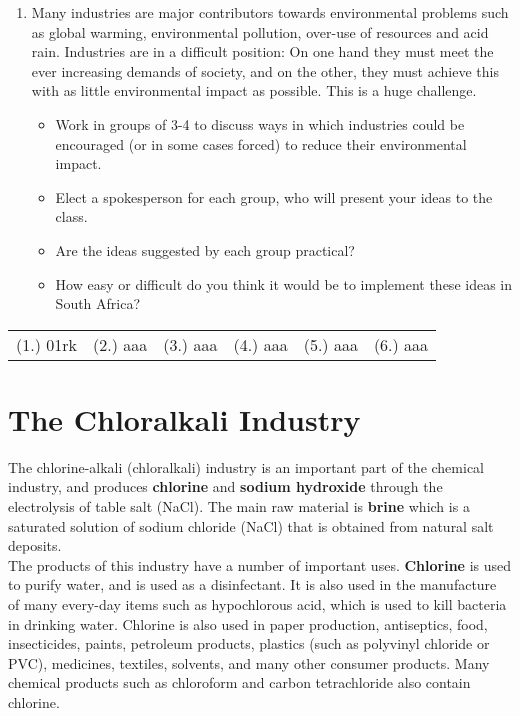 {\begin{enumerate}
\item{Many industries are major contributors towards environmental problems such as global warming, environmental pollution, over-use of resources and acid rain. Industries are in a difficult position: On one hand they must meet the ever increasing demands of society, and on the other, they must achieve this with as little environmental impact as possible. This is a huge challenge.

\begin{itemize}
\item{Work in groups of 3-4 to discuss ways in which industries could be encouraged (or in some cases forced) to reduce their environmental impact.}
\item{Elect a spokesperson for each group, who will present your ideas to the class.}
\item{Are the ideas suggested by each group practical?}
\item{How easy or difficult do you think it would be to implement these ideas in South Africa?}
\end{itemize}}
\end{enumerate}

\par \practiceinfo
\par \begin{tabular}[h]{cccccc}
(1.)	01rk	&
(2.)	aaa	&
(3.)	aaa	&
(4.)	aaa	&
(5.)	aaa	&
(6.)	aaa	\\
\end{tabular}
}


\section{The Chloralkali Industry}
\label{sec:chemical:chloralkali}

The chlorine-alkali (chloralkali) industry is an important part of the chemical industry, and produces \textbf{chlorine} and \textbf{sodium hydroxide} through the electrolysis of table salt (NaCl). The main raw material is \textbf{brine} which is a saturated solution of sodium chloride (NaCl) that is obtained from natural salt deposits. \\

The products of this industry have a number of important uses. \textbf{Chlorine} is used to purify water, and is used as a disinfectant. It is also used in the manufacture of many every-day items such as hypochlorous acid, which is used to kill bacteria in drinking water. Chlorine is also used in paper production, antiseptics, food, insecticides, paints, petroleum products, plastics (such as polyvinyl chloride or PVC), medicines, textiles, solvents, and many other consumer products. Many chemical products such as chloroform and carbon tetrachloride also contain chlorine.\\

